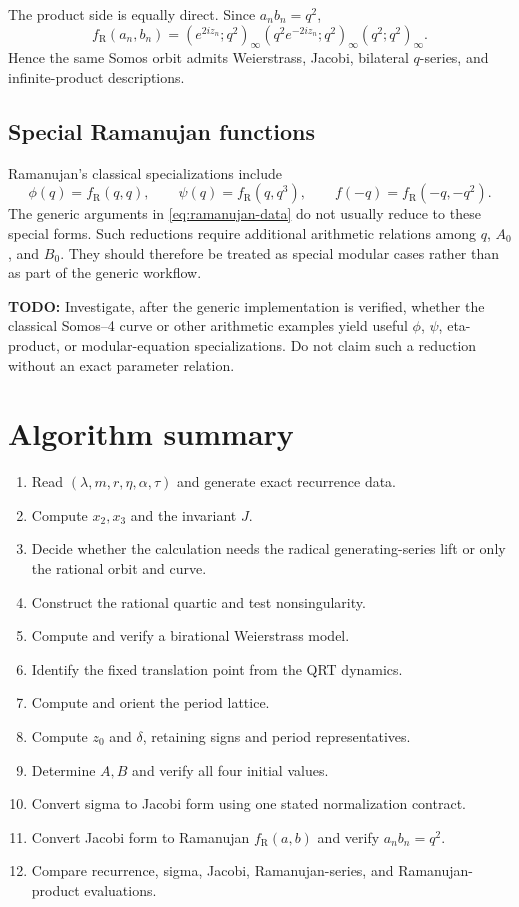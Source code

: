\documentclass[11pt]{article}
\newcommand{\taupar}{\tau}
\newcommand{\RamF}{f_{\mathrm R}}
\newcommand{\TODO}[1]{\par\noindent\textcolor{red!70!black}{\textbf{TODO:} #1}\par}
\begin{document}
The product side is equally direct.  Since $a_nb_n=q^2$,
\begin{equation}
 \RamF(a_n,b_n)=
 (e^{2iz_n};q^2)_\infty
 (q^2e^{-2iz_n};q^2)_\infty
 (q^2;q^2)_\infty.
 \label{eq:ramanujan-product}
\end{equation}
Hence the same Somos orbit admits Weierstrass, Jacobi, bilateral $q$-series,
and infinite-product descriptions.

\subsection{Special Ramanujan functions}
Ramanujan's classical specializations include
\[
 \phi(q)=\RamF(q,q),\qquad
 \psi(q)=\RamF(q,q^3),\qquad
 f(-q)=\RamF(-q,-q^2).
\]
The generic arguments in \cref{eq:ramanujan-data} do not usually reduce to
these special forms.  Such reductions require additional arithmetic relations
among $q$, $A_0$, and $B_0$.  They should therefore be treated as special
modular cases rather than as part of the generic workflow.

\TODO{Investigate, after the generic implementation is verified, whether the
classical Somos--4 curve or other arithmetic examples yield useful
$\phi$, $\psi$, eta-product, or modular-equation specializations.  Do not claim
such a reduction without an exact parameter relation.}

\section{Algorithm summary}
\begin{enumerate}[label=\textbf{Step \arabic*.},leftmargin=2.7em]
 \item Read $(\lambda,m,r,\eta,\alpha,\taupar)$ and generate exact recurrence
       data.
 \item Compute $x_2,x_3$ and the invariant $J$.
 \item Decide whether the calculation needs the radical generating-series
       lift or only the rational orbit and curve.
 \item Construct the rational quartic and test nonsingularity.
 \item Compute and verify a birational Weierstrass model.
 \item Identify the fixed translation point from the QRT dynamics.
 \item Compute and orient the period lattice.
 \item Compute $z_0$ and $\delta$, retaining signs and period representatives.
 \item Determine $A,B$ and verify all four initial values.
 \item Convert sigma to Jacobi form using one stated normalization contract.
 \item Convert Jacobi form to Ramanujan $\RamF(a,b)$ and verify
       $a_nb_n=q^2$.
 \item Compare recurrence, sigma, Jacobi, Ramanujan-series, and
       Ramanujan-product evaluations.
\end{enumerate}
\end{document}
